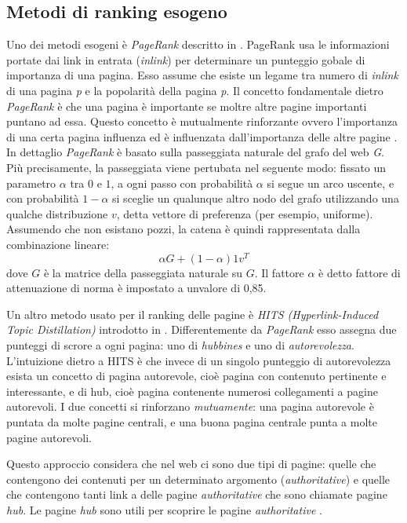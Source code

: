 \subsection{Metodi di ranking esogeno}
Uno dei metodi esogeni è \textit{PageRank} descritto in \cite{ilprints422}. PageRank usa le informazioni portate dai link in entrata (\textit{inlink}) per determinare un punteggio gobale di importanza di una pagina. Esso assume che esiste un legame tra numero di \textit{inlink} di una pagina \textit{p} e la popolarità della pagina \textit{p}. Il concetto fondamentale dietro \textit{PageRank} è che una pagina è importante se moltre altre pagine importanti puntano ad essa. Questo concetto è mutualmente rinforzante ovvero l'importanza di una certa pagina influenza ed è influenzata dall'importanza delle altre pagine \cite{ilprints646}. In dettaglio \textit{PageRank} è basato sulla passeggiata naturale del grafo del web \textit{G}. Più precisamente, la passeggiata viene pertubata nel seguente modo: fissato un parametro \(\alpha\) tra \(0\) e \(1\), a ogni passo con probabilità \(\alpha\) si segue un arco uscente, e con probabilità \(1- \alpha \) si sceglie un qualunque altro nodo del grafo utilizzando una qualche 
distribuzione \(v\), detta
vettore di preferenza (per esempio, uniforme). Assumendo che non esistano pozzi, la catena è quindi rappresentata dalla combinazione lineare:
\begin{equation}
 \alpha G + (1 - \alpha) 1 v^T
\end{equation}
dove \(G\) è la matrice della passeggiata naturale su \(G\). Il fattore \(\alpha\) è detto fattore di attenuazione di norma è impostato a unvalore di 0,85.

Un altro metodo usato per il ranking delle pagine è \textit{HITS (Hyperlink-Induced Topic Distillation)} introdotto in \cite{Kleinberg:1999:ASH:324133.324140}. Differentemente da \textit{PageRank} esso assegna due punteggi di scrore a ogni pagina: uno di \textit{hubbines} e uno di \textit{autorevolezza}. L’intuizione dietro a HITS è che invece di un singolo punteggio di autorevolezza esista un concetto di pagina autorevole, cioè pagina con contenuto pertinente e interessante, e di hub, cioè pagina contenente numerosi collegamenti a pagine autorevoli. I due concetti si rinforzano \textit{mutuamente}: una pagina autorevole è puntata da molte pagine centrali, e una buona pagina centrale punta a molte pagine autorevoli.

Questo approccio considera che nel web ci sono due tipi di pagine: quelle che contengono dei contenuti per un determinato argomento (\textit{authoritative}) e quelle che contengono tanti link a delle pagine \textit{authoritative} che sono chiamate pagine \textit{hub}. Le pagine \textit{hub} sono utili per scoprire le pagine \textit{authoritative} \cite{Manning:2008:IIR:1394399p474}.

